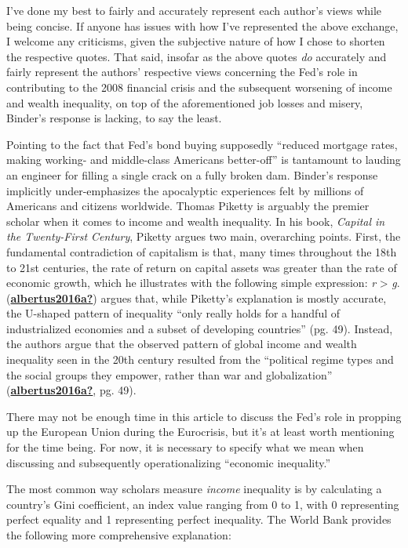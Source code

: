\documentclass[
  11pt,
]{article}
\begin{document}
I've done my best to fairly and accurately represent each author's views
while being concise. If anyone has issues with how I've represented the
above exchange, I welcome any criticisms, given the subjective nature of
how I chose to shorten the respective quotes. That said, insofar as the
above quotes \emph{do} accurately and fairly represent the authors'
respective views concerning the Fed's role in contributing to the 2008
financial crisis and the subsequent worsening of income and wealth
inequality, on top of the aforementioned job losses and misery, Binder's
response is lacking, to say the least.

Pointing to the fact that Fed's bond buying supposedly ``reduced
mortgage rates, making working- and middle-class Americans better-off''
is tantamount to lauding an engineer for filling a single crack on a
fully broken dam. Binder's response implicitly under-emphasizes the
apocalyptic experiences felt by millions of Americans and citizens
worldwide. Thomas Piketty is arguably the premier scholar when it comes
to income and wealth inequality. In his book, \emph{Capital in the
Twenty-First Century}, Piketty argues two main, overarching points.
First, the fundamental contradiction of capitalism is that, many times
throughout the 18th to 21st centuries, the rate of return on capital
assets was greater than the rate of economic growth, which he
illustrates with the following simple expression: \emph{r}
\textgreater{} \emph{g}.
(\protect\hyperlink{ref-albertus2016a}{\textbf{albertus2016a?}}) argues
that, while Piketty's explanation is mostly accurate, the U-shaped
pattern of inequality ``only really holds for a handful of
industrialized economies and a subset of developing countries'' (pg.
49). Instead, the authors argue that the observed pattern of global
income and wealth inequality seen in the 20th century resulted from the
``political regime types and the social groups they empower, rather than
war and globalization''
(\protect\hyperlink{ref-albertus2016a}{\textbf{albertus2016a?}}, pg.
49).

There may not be enough time in this article to discuss the Fed's role
in propping up the European Union during the Eurocrisis, but it's at
least worth mentioning for the time being. For now, it is necessary to
specify what we mean when discussing and subsequently operationalizing
``economic inequality.''

The most common way scholars measure \emph{income} inequality is by
calculating a country's Gini coefficient, an index value ranging from 0
to 1, with 0 representing perfect equality and 1 representing perfect
inequality. The World Bank provides the following more comprehensive
explanation:
\end{document}
